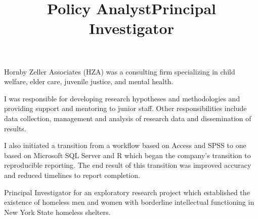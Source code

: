 \documentclass[line, mm, 10pt]{res}
\begin{document}
\begin{resume}
  
  \title{Policy Analyst}
  \begin{position}
    Hornby Zeller Associates (HZA) was a consulting firm specializing in child
    welfare, elder care, juvenile justice, and mental health. 
    
    I was responsible for developing research hypotheses and methodologies and
    providing support and mentoring to junior staff. Other responsibilities
    include data collection, management and analysis of research data and
    dissemination of results. 
    
    I also initiated a transition from a workflow based on Access and SPSS to
    one based on Microsoft SQL Server and R which began the company's transition
    to reproducible reporting. The end result of this transition was improved
    accuracy and reduced timelines to report completion.
  \end{position}


  \title{Principal Investigator}
  \begin{position}
    Principal Investigator for an exploratory research project which established
    the existence of homeless men and women with borderline intellectual
    functioning in New York State homeless shelters.
  \end{position}










\end{resume}
\end{document}
